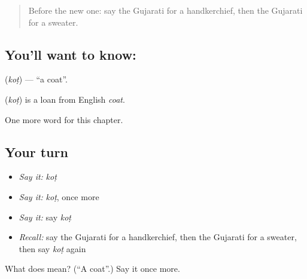 \label{lesson:GU-C112-kot}



\begin{quote}
Before the new one: say the Gujarati for a handkerchief, then the Gujarati for a sweater.
\end{quote}

\subsection*{You'll want to know: }
\textbf{} (\emph{koṭ}) — \textquotedblleft{}a coat\textquotedblright{}.

\begin{cousinweb}
\textbf{} (\emph{koṭ}) is a loan from English \emph{coat}.
\end{cousinweb}

\begin{grammarlens}[title={What you've built}]
One more word for this chapter.
\end{grammarlens}

\subsection*{Your turn}
\begin{itemize}
\raggedright
  \item \emph{Say it:} \emph{koṭ}
  \item \emph{Say it:} \emph{koṭ}, once more
  \item \emph{Say it:} say \emph{koṭ}
  \item \emph{Recall:} say the Gujarati for a handkerchief, then the Gujarati for a sweater, then say \emph{koṭ} again
\end{itemize}

\begin{tcolorbox}[breakable,colback=teal!4,colframe=teal!35!black,title={Before you move on}]
What does  mean? (\textquotedblleft{}A coat\textquotedblright{}.) Say it once more.
\end{tcolorbox}
